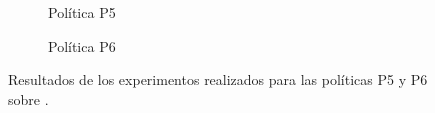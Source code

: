 \begin{figure}
  \centering

  \begin{subfigure}{0.9\textwidth}
    \centering
    \caption*{Política P5}
  \end{subfigure}
  
  \begin{subfigure}{0.9\textwidth}
    \centering
    \caption*{Política P6}
  \end{subfigure}

  \caption{Resultados de los experimentos realizados para las políticas P5
    y P6 sobre \odroid.}
  \label{fig:detalle:p5-p6}
\end{figure}



